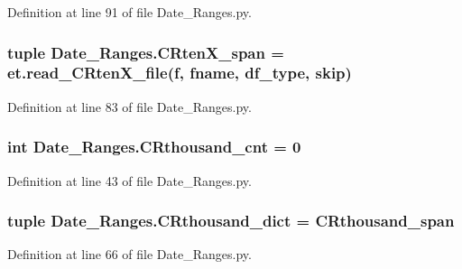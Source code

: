 Definition at line 91 of file Date\+\_\+\+Ranges.\+py.

\hypertarget{namespace_date___ranges_a2aa7bd3a9fbf74e4eb8bb02ef545ee18}{}
\subsubsection[{C\+Rten\+X\+\_\+span}]{\setlength{\rightskip}{0pt plus 5cm}tuple Date\+\_\+\+Ranges.\+C\+Rten\+X\+\_\+span = et.\+read\+\_\+\+C\+Rten\+X\+\_\+file({\bf f}, fname, {\bf df\+\_\+type}, {\bf skip})}\label{namespace_date___ranges_a2aa7bd3a9fbf74e4eb8bb02ef545ee18}


Definition at line 83 of file Date\+\_\+\+Ranges.\+py.

\hypertarget{namespace_date___ranges_a2415665778377c640e186f6bb947c2c6}{}
\subsubsection[{C\+Rthousand\+\_\+cnt}]{\setlength{\rightskip}{0pt plus 5cm}int Date\+\_\+\+Ranges.\+C\+Rthousand\+\_\+cnt = 0}\label{namespace_date___ranges_a2415665778377c640e186f6bb947c2c6}


Definition at line 43 of file Date\+\_\+\+Ranges.\+py.

\hypertarget{namespace_date___ranges_ab0958a6af22d624e05417468a7406ad3}{}
\subsubsection[{C\+Rthousand\+\_\+dict}]{\setlength{\rightskip}{0pt plus 5cm}tuple Date\+\_\+\+Ranges.\+C\+Rthousand\+\_\+dict = {\bf C\+Rthousand\+\_\+span}}\label{namespace_date___ranges_ab0958a6af22d624e05417468a7406ad3}


Definition at line 66 of file Date\+\_\+\+Ranges.\+py.

\hypertarget{namespace_date___ranges_ab7a9f3dbdd1532a99ec785cb471b70b7}{}
